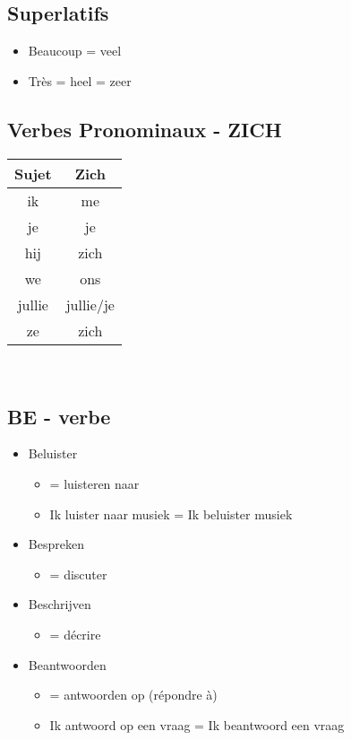 \documentclass[a4paper]{article}
\begin{document}
\subsection{Superlatifs}
\begin{itemize}[label=\textbullet, font=\Large]
  \item Beaucoup = veel
  \item Très = heel = zeer
\end{itemize}

\subsection{Verbes Pronominaux - ZICH}
\begin{tabular}{|c|c|}
  \hline
  \textbf{Sujet} & \textbf{Zich}\\
  \hline
  ik & me\\
  \hline
  je & je\\
  \hline
  hij & zich\\
  \hline
  we & ons\\
  \hline
  jullie & jullie/je\\
  \hline
  ze & zich\\
  \hline
\end{tabular}\\

\subsection{BE - verbe}
\begin{itemize}[label=\textbullet, font=\Large]
  \item Beluister
  \begin{itemize}[label=, font=\scriptsize]
    \item = luisteren naar
    \item Ik luister naar musiek = Ik beluister musiek
  \end{itemize}
  \item Bespreken
  \begin{itemize}[label=, font=\scriptsize]
    \item = discuter
  \end{itemize}
  \item Beschrijven
  \begin{itemize}[label=, font=\scriptsize]
    \item = décrire
  \end{itemize}
  \item Beantwoorden
  \begin{itemize}[label=, font=\scriptsize]
    \item = antwoorden op (répondre à)
    \item Ik antwoord op een vraag = Ik beantwoord een vraag
  \end{itemize}
\end{itemize}
\end{document}
